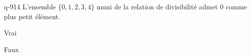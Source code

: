\begin{truefalse}{q-914}
L'ensemble $\{0,1,2,3,4\}$ muni de la relation de divisibilité admet $0$ comme plus petit élément.
\item Vrai
\item* Faux
\end{truefalse}

